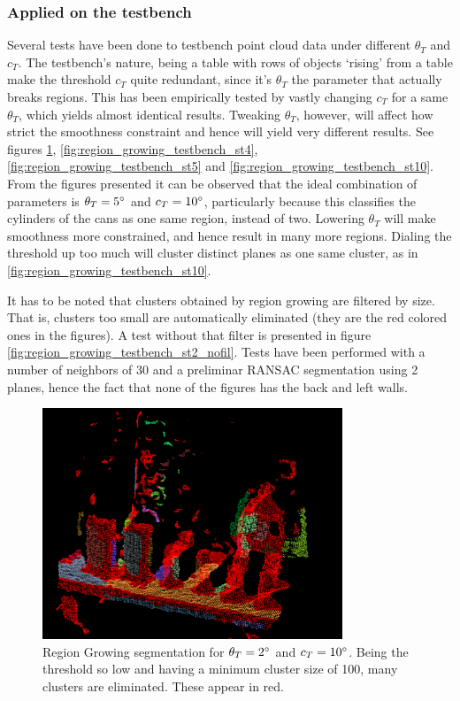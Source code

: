 \documentclass[../main.tex]{subfiles}
\begin{document}
\subsubsection{Applied on the testbench}
Several tests have been done to testbench point cloud data under different $\theta_{T}$ and $c_{T}$. The testbench's nature, being a table with rows of objects `rising' from a table make the threshold $c_{T}$ quite redundant, since it's $\theta_{T}$ the parameter that actually breaks regions. This has been empirically tested by vastly changing $c_{T}$ for a same $\theta_{T}$, which yields almost identical results. Tweaking $\theta_{T}$, however, will affect how strict the smoothness constraint and hence will yield very different results. See figures \ref{fig:region_growing_testbench_st2}, \ref{fig:region_growing_testbench_st4}, \ref{fig:region_growing_testbench_st5} and \ref{fig:region_growing_testbench_st10}. From the figures presented it can be observed that the ideal combination of parameters is $\theta_{T}=5\degree$ and $c_{T}=10\degree$, particularly because this classifies the cylinders of the cans as one same region, instead of two. Lowering $\theta_{T}$ will make smoothness more constrained, and hence result in many more regions. Dialing the threshold up too much will cluster distinct planes as one same cluster, as in \ref{fig:region_growing_testbench_st10}. 

It has to be noted that clusters obtained by region growing are filtered by size. That is, clusters too small are automatically eliminated (they are the red colored ones in the figures). A test without that filter is presented in figure \ref{fig:region_growing_testbench_st2_nofil}. Tests have been performed with a number of neighbors of 30 and a preliminar RANSAC segmentation using 2 planes, hence the fact that none of the figures has the back and left walls.


\begin{figure}[htbp]
    \centering
    \includegraphics[width=0.8\textwidth]{images/region_growing_testbench_st2.png}
    \caption{Region Growing segmentation for $\theta_{T}=2\degree$ and $c_{T}=10\degree$. Being the threshold so low and having a minimum cluster size of 100, many clusters are eliminated. These appear in red.}
    \label{fig:region_growing_testbench_st2}
\end{figure}
\end{document}
